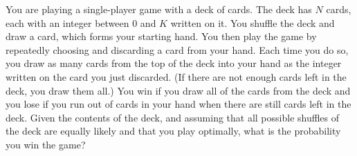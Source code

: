 




You are playing a single-player game with a deck of cards. The deck has $N$ cards, each with an integer between $0$ and $K$ written on it. You shuffle the deck and draw a card, which forms your starting hand. You then play the game by repeatedly choosing and discarding a card from your hand. Each time you do so, you draw as many cards from the top of the deck into your hand as the integer written on the card you just discarded. (If there are not enough cards left in the deck, you draw them all.) You win if you draw all of the cards from the deck and you lose if you run out of cards in your hand when there are still cards left in the deck.  Given the contents of the deck, and assuming that all possible shuffles of the deck are equally likely and that you play optimally, what is the probability you win the game?

